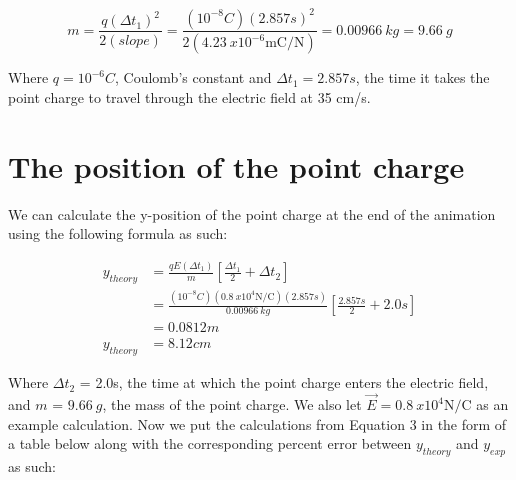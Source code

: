 \documentclass[12pt]{article}
\begin{document}
\begin{equation} \label{eq2}
    m = \frac{q(\Delta t_1)^2}{2(slope)} = \frac{(10^{-8}C)(2.857s)^2}{2(\SI{4.23}{x10^{-6}\metre\coulomb\per\newton})} = \SI{0.00966}{kg} = \SI{9.66}{g}
\end{equation}

Where $q=10^{-6}C$, Coulomb's constant and $\Delta t_1=2.857s$, the time it takes the point charge to travel through the electric field at 35 cm/s.

\section{The position of the point charge}
We can calculate the y-position of the point charge at the end of the animation using the following formula as such:

\begin{equation} \label{eq3}
    \begin{split}
        y_{theory} & = \frac{qE(\Delta t_1)}{m}\left[\frac{\Delta t_1}{2} + \Delta t_2\right] \\
        & =\frac{(10^{-8}C)(\SI{0.8}{x10^4\newton\per\coulomb})(2.857s)}{\SI{0.00966}{kg}}\left[\frac{2.857s}{2} + 2.0s\right] \\
        & = 0.0812 m \\
        y_{theory} & = 8.12 cm
    \end{split}
\end{equation}

Where $\Delta t_2$ = 2.0s, the time at which the point charge enters the electric field, and $m$ = $\SI{9.66}{g}$, the mass of the point charge. We also let $\vec{E}=\SI{0.8}{x10^4\newton\per\coulomb}$ as an example calculation.
Now we put the calculations from Equation 3 in the form of a table below along with the corresponding percent error between $y_{theory}$ and $y_{exp}$ as such:

\setlength{\tabcolsep}{3pt}
\renewcommand{\arraystretch}{1.1}
\end{document}
